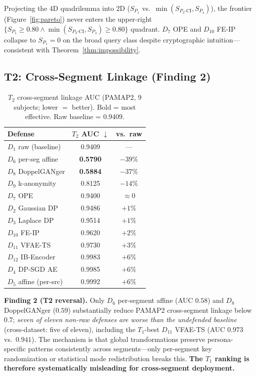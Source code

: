 \documentclass{article}
\theoremstyle{remark}
\newcommand{\SCI}{S_{P_3\text{-CI}}}
\begin{document}
Projecting the 4D quadrilemma into 2D ($S_{P_1}$ vs.\ $\min(\SCI, S_{P_4})$), the frontier (Figure~\ref{fig:pareto}) never enters the upper-right $\{S_{P_1} \ge 0.80 \wedge \min(\SCI, S_{P_4}) \ge 0.80\}$ quadrant. $D_7$ OPE and $D_{10}$ FE-IP collapse to $S_{P_1} = 0$ on the broad query class despite cryptographic intuition---consistent with Theorem~\ref{thm:impossibility}.

\subsection{T2: Cross-Segment Linkage (Finding 2)}

\begin{table}[h]
\centering
\caption{$T_2$ cross-segment linkage AUC (PAMAP2, 9 subjects; lower $= $ better). Bold = most effective. Raw baseline = 0.9409.}
\label{tab:t2}
\small
\begin{tabular}{@{}lcc@{}}
\toprule
Defense & $T_2$ AUC $\downarrow$ & vs.\ raw \\
\midrule
$D_1$ raw (baseline)         & 0.9409 & --- \\
$D_6$ per-seg affine         & \textbf{0.5790} & $-39\%$ \\
$D_8$ DoppelGANger           & \textbf{0.5884} & $-37\%$ \\
$D_9$ k-anonymity            & 0.8125 & $-14\%$ \\
$D_7$ OPE                    & 0.9400 & $\approx 0$ \\
$D_2$ Gaussian DP            & 0.9486 & \emph{$+1\%$} \\
$D_3$ Laplace DP             & 0.9514 & \emph{$+1\%$} \\
$D_{10}$ FE-IP               & 0.9620 & \emph{$+2\%$} \\
$D_{11}$ VFAE-TS             & 0.9730 & \emph{$+3\%$} \\
$D_{12}$ IB-Encoder          & 0.9983 & \emph{$+6\%$} \\
$D_4$ DP-SGD AE              & 0.9985 & \emph{$+6\%$} \\
$D_5$ affine (per-src)       & 0.9992 & \emph{$+6\%$} \\
\bottomrule
\end{tabular}
\end{table}

\textbf{Finding 2 (T2 reversal).} Only $D_6$ per-segment affine (AUC $0.58$) and $D_8$ DoppelGANger ($0.59$) substantially reduce PAMAP2 cross-segment linkage below $0.7$; \emph{seven of eleven non-raw defenses are worse than the undefended baseline} (cross-dataset: five of eleven), including the $T_1$-best $D_{11}$ VFAE-TS (AUC $0.973$ vs.\ $0.941$). The mechanism is that global transformations preserve persona-specific patterns consistently across segments---only per-segment key randomization or statistical mode redistribution breaks this. \textbf{The $T_1$ ranking is therefore systematically misleading for cross-segment deployment.}
\end{document}

